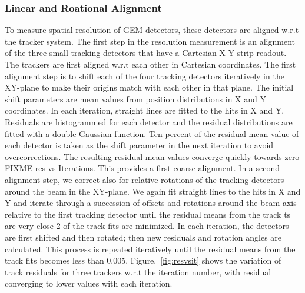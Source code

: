 \subsubsection{Linear and Roational Alignment}
To measure spatial resolution of GEM detectors, these detectors are aligned w.r.t the tracker system.
The first step in the resolution measurement is an alignment of the three small tracking detectors that have a Cartesian X-Y strip readout. The trackers are first aligned w.r.t each other in Cartesian coordinates. The first alignment step is to shift each of the four tracking detectors iteratively in the XY-plane to make their origins match with each other in that plane. The initial shift parameters are mean values from position distributions in X and Y coordinates. In each iteration, straight lines are fitted to the hits in X and Y. Residuals are histogrammed for each detector and the residual distributions are fitted with a double-Gaussian function. Ten percent of the residual mean value of each detector is taken as the shift parameter in the next iteration to avoid overcorrections. The resulting residual mean values converge quickly towards zero FIXME res vs Iterations. This provides a first coarse alignment. In a second alignment step, we correct also for relative rotations of the tracking detectors around the beam in the XY-plane. We again fit straight lines to the hits in X and Y and iterate through a succession of offsets and rotations around the beam axis relative to the first tracking detector until the residual means from the track ts are very close 2 of the track fits are minimized. In each iteration, the detectors are first shifted and then rotated; then new residuals and rotation angles are calculated. This process is repeated iteratively until the residual means from the track fits becomes less than 0.005. Figure.~\ref{fig:resvsit} shows the variation of track residuals for three trackers w.r.t the iteration number, with residual converging to lower values with each iteration.
